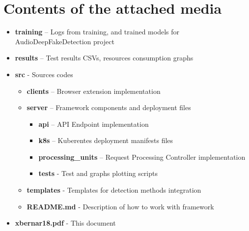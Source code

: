 \chapter{Contents of the attached media}

\begin{itemize}
    \item[] \textbf{training} – Logs from training, and trained models for AudioDeepFakeDetection project
    \item[] \textbf{results} – Test results CSVs, resources consumption graphs
    \item[] \textbf{src} - Sources codes
    \begin{itemize}
        \item[] \textbf{clients} – Browser extension implementation
        \item[] \textbf{server} – Framework components and deployment files
        \begin{itemize}
            \item[] \textbf{api} – API Endpoint implementation
            \item[] \textbf{k8s} – Kuberentes deployment manifests files
            \item[] \textbf{processing\_units} – Request Processing Controller implementation
            \item[] \textbf{tests} - Test and graphs plotting scripts        
        \end{itemize}
        \item[] \textbf{templates} - Templates for detection methods integration
        \item[] \textbf{README.md} - Description of how to work with framework
    \end{itemize}
    \item[] \textbf{xbernar18.pdf} - This document
\end{itemize}

